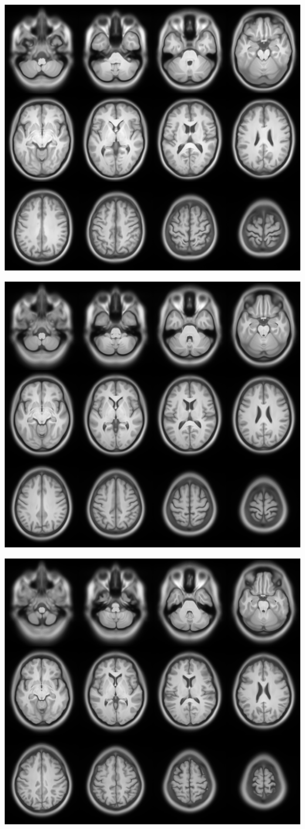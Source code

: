 \begin{frame}
\begin{center}
\includegraphics[width=.8\textwidth]{hyper_male}
\end{center}
\end{frame}

\begin{frame}
\begin{center}
\includegraphics[width=.8\textwidth]{avgT1}
\end{center}
\end{frame}

\begin{frame}
\begin{center}
\includegraphics[width=.8\textwidth]{hyper_female}
\end{center}
\end{frame}


